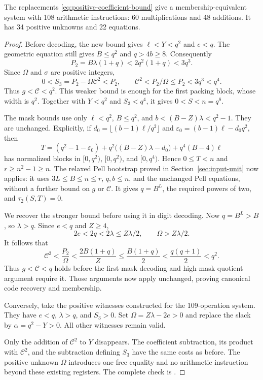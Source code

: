 \begin{proposition}\label{prop:positive-coefficient108}
The replacements \eqref{eq:positive-coefficient-bound} give a
membership-equivalent system with 108 arithmetic instructions:
60 multiplications and 48 additions. It has 34 positive unknowns
and 22 equations.
\end{proposition}
\begin{proof}
Before decoding, the new bound gives $\ell<Y<q^2$ and $e<q$.
The geometric equation still gives $B\le q^2$ and $q>4b\ge8$.
Consequently
\[
 P_2=B\lambda(1+q)<2q^2(1+q)<3q^3.
\]
Since $\Omega$ and $\sigma$ are positive integers,
\[
 0<S_3=P_2-\Omega\mathcal C^2<P_2,
 \qquad \mathcal C^2<P_2/\Omega\le P_2<3q^3<q^4.
\]
Thus $g<\mathcal C<q^2$. This weaker bound is enough for the first
packing block, whose width is $q^2$. Together with $Y<q^2$ and
$S_3<q^4$, it gives $0<S<n=q^8$.

The mask bounds use only $\ell<q^2$, $B\le q^2$, and
$b<(B-Z)\lambda<q^2-1$. They are unchanged. Explicitly, if
$d_0=\lfloor(b-1)\ell/q^2\rfloor$ and
$\varepsilon_0=(b-1)\ell-d_0q^2$, then
\[
 T=(q^2-1-\varepsilon_0)
       +q^2\bigl((B-Z)\lambda-d_0\bigr)+q^4(B-4)\ell
\]
has normalized blocks in $[0,q^2)$, $[0,q^2)$, and $[0,q^4)$.
Hence $0\le T<n$ and $r\ge n^2-1\ge n$.
The relaxed Pell bootstrap proved in Section~\ref{sec:input-unit}
now applies: it uses $3L\le B\le n\le r$, $q,b\le n$, and the
unchanged Pell equations, without a further bound on $g$ or
$\mathcal C$. It gives $q=B^L$, the required powers of two,
and $\tau_2(S,T)=0$.

We recover the stronger bound before using it in digit decoding.
Now $q=B^L>B$, so $\lambda>q$. Since $e<q$ and $Z\ge4$,
\[
 2e<2q<2\lambda\le Z\lambda/2,
 \qquad \Omega>Z\lambda/2.
\]
It follows that
\[
 \mathcal C^2<\frac{P_2}{\Omega}
       <\frac{2B(1+q)}Z
       \le\frac{B(1+q)}2
       <\frac{q(q+1)}2<q^2.
\]
Thus $g<\mathcal C<q$ holds before the first-mask decoding and
high-mask quotient argument require it. Those arguments now apply
unchanged, proving canonical code recovery and membership.

Conversely, take the positive witnesses constructed for the
109-operation system. They have $e<q$, $\lambda>q$, and $S_3>0$.
Set $\Omega=Z\lambda-2e>0$ and replace the slack by
$\alpha=q^2-Y>0$. All other witnesses remain valid.

Only the addition of $\mathcal C^2$ to $Y$ disappears.
The coefficient subtraction, its product with $\mathcal C^2$, and
the subtraction defining $S_3$ have the same costs as before.
The positive unknown $\Omega$ introduces one free equality and no
arithmetic instruction beyond these existing registers.
The complete check is .
\end{proof}

